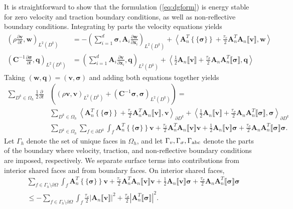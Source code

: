 \documentclass{siamart0216}
\newcommand{\pd}[2]{\frac{\partial#1}{\partial#2}}
\newcommand{\LRp}[1]{\left( #1 \right)}
\newcommand{\LRa}[1]{\left\langle #1 \right\rangle}
\newcommand{\LRb}[1]{\left| #1 \right|}
\newcommand{\LRc}[1]{\left\{ #1 \right\}}
\newcommand{\jump}[1] {\ensuremath{\llbracket#1\rrbracket}}
\newcommand{\avg}[1] {\ensuremath{\LRc{\!\{#1\}\!}}}
\renewcommand{\Oh}{{\Omega_h}}
\newcommand{\Lk}{L^2\LRp{D^k}}
\begin{document}
It is straightforward to show that the formulation (\ref{eq:dgform}) is energy stable for zero velocity and traction boundary conditions, as well as non-reflective boundary conditions.  Integrating by parts the velocity equations yields
\begin{align}
\LRp{\rho \pd{\bm{v}}{t},\bm{w}}_{\Lk} &= -\LRp{ \sum_{i=1}^d \bm{\sigma},\bm{A}_i \pd{\bm{w}}{\bm{x}_i}}_{\Lk}  + \LRa{\bm{A}_n^T\avg{\bm{\sigma}} + \frac{\tau_v}{2}\bm{A}_n^T\bm{A}_n\jump{\bm{v}},\bm{w}} \nonumber\\
\LRp{\bm{C}^{-1} \pd{\bm{\sigma}}{t},\bm{q}}_{\Lk} &= \LRp{\sum_{i=1}^d \bm{A}_i \pd{\bm{v}}{\bm{x}_i},\bm{q}}_{\Lk} + \LRa{\frac{1}{2}\bm{A}_n\jump{\bm{v}} + \frac{\tau_{\sigma}}{2}\bm{A}_n\bm{A}_n^T\jump{\bm{\sigma}},\bm{q}} \label{eq:dgform}
\end{align}
Taking $(\bm{w},\bm{q}) = (\bm{v},\bm{\sigma})$ and adding both equations together yields
\begin{align*}
\sum_{D^k\in \Oh}\frac{1}{2}\pd{}{t}&\LRp{\LRp{\rho \bm{v},\bm{v}}_{\Lk} + \LRp{\bm{C}^{-1} \bm{\sigma},\bm{\sigma}}_{\Lk}} =  \\
&\sum_{D^k\in \Omega_h}\LRa{\bm{A}_n^T\avg{\bm{\sigma}} + \frac{\tau_v}{2}\bm{A}_n^T\bm{A}_n\jump{\bm{v}},\bm{v}}_{\partial D^k}+ \LRa{\frac{1}{2}\bm{A}_n\jump{\bm{v}} + \frac{\tau_\sigma}{2}\bm{A}_n\bm{A}_n^T\jump{\bm{\sigma}},\bm{\sigma}}_{\partial D^k}  \\
&\sum_{D^k\in \Omega_h}\sum_{f\in \partial D^k}\int_{f}{\bm{A}_n^T\avg{\bm{\sigma}}\bm{v} + \frac{\tau_v}{2}\bm{A}_n^T\bm{A}_n\jump{\bm{v}}\bm{v}} + {\frac{1}{2}\bm{A}_n\jump{\bm{v}}\bm{\sigma} + \frac{\tau_\sigma}{2}\bm{A}_n\bm{A}_n^T\jump{\bm{\sigma}}\bm{\sigma}}.
\end{align*}
Let $\Gamma_h$ denote the set of unique faces in $\Oh$, and let $\Gamma_v,\Gamma_\sigma,\Gamma_{\rm abc}$ denote the parts of the boundary where velocity, traction, and non-reflective boundary conditions are imposed, respectively.  We separate surface terms into contributions from interior shared faces and from boundary faces.  On interior shared faces, 
\begin{align*}
&\sum_{f\in \Gamma_h \setminus \partial \Omega} \int_{f}{\bm{A}_n^T\avg{\bm{\sigma}}\bm{v} + \frac{\tau_v}{2}\bm{A}_n^T\bm{A}_n\jump{\bm{v}}\bm{v}} + {\frac{1}{2}\bm{A}_n\jump{\bm{v}}\bm{\sigma} + \frac{\tau_\sigma}{2}\bm{A}_n\bm{A}_n^T\jump{\bm{\sigma}}\bm{\sigma}}\\
&\leq - \sum_{f \in\Gamma_h \setminus \partial \Omega} \int_{f} \frac{\tau_v}{2}\LRb{\bm{A}_n\jump{\bm{v}}}^2 + \frac{\tau_\sigma}{2}\LRb{\bm{A}_n^T\jump{\bm{\sigma}}}^2.  
\end{align*}
\end{document}
